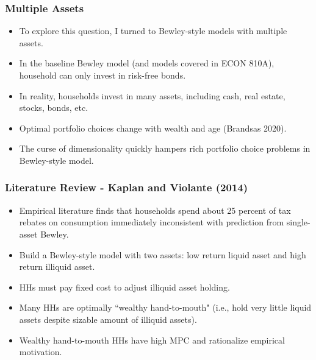 \documentclass[handout]{beamer}
\begin{document}
\begin{frame}
\frametitle{Multiple Assets}
\begin{itemize}[<+->]
\item To explore this question, I turned to Bewley-style models with multiple assets.
\bigskip
\item In the baseline Bewley model (and models covered in ECON 810A), household can only invest in risk-free bonds.
\bigskip
\item In reality, households invest in many assets, including cash, real estate, stocks, bonds, etc.
\bigskip
\item Optimal portfolio choices change with wealth and age (Brandsas 2020).
\bigskip
\item The curse of dimensionality quickly hampers rich portfolio choice problems in Bewley-style model.
\end{itemize}
\end{frame}





\begin{frame}
\frametitle{Literature Review - Kaplan and Violante (2014)}


\begin{itemize}[<+->]
\item Empirical literature finds that households spend about 25 percent of tax rebates on consumption immediately inconsistent with prediction from single-asset Bewley.
\bigskip
\item Build a Bewley-style model with two assets: low return liquid asset and high return illiquid asset.
\bigskip
\item HHs must pay fixed cost to adjust illiquid asset holding.
\bigskip
\item Many HHs are optimally ``wealthy hand-to-mouth" (i.e., hold very little liquid assets despite sizable amount of illiquid assets).
\bigskip
\item Wealthy hand-to-mouth HHs have high MPC and rationalize empirical motivation.
\end{itemize}

\end{frame}
\end{document}
